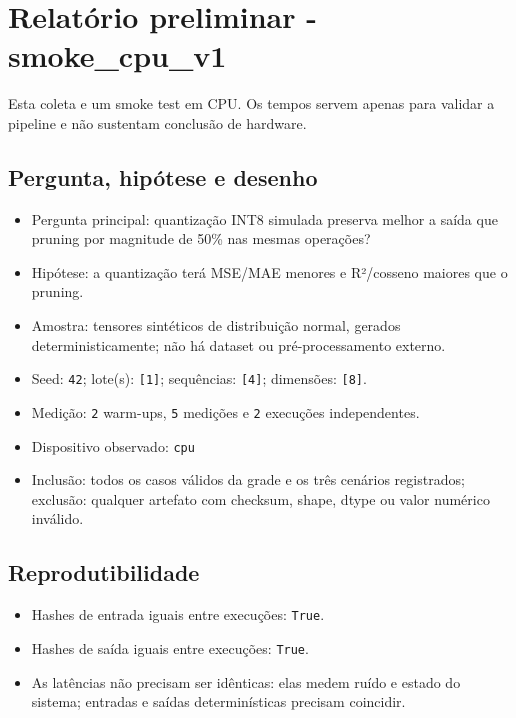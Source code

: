 

\chapter{Relatório preliminar - smoke\_\allowbreak{}cpu\_\allowbreak{}v1}



\begin{icquote}
Esta coleta e um smoke test em CPU. Os tempos servem apenas para validar a pipeline e não sustentam conclusão de hardware.
\end{icquote}



\section{Pergunta, hipótese e desenho}


\begin{itemize}
\item Pergunta principal: quantização INT8 simulada preserva melhor a saída que pruning por magnitude de 50\% nas mesmas operações?
\item Hipótese: a quantização terá MSE/MAE menores e R²/cosseno maiores que o pruning.
\item Amostra: tensores sintéticos de distribuição normal, gerados deterministicamente; não há dataset ou pré-processamento externo.
\item Seed: \texttt{42}; lote(s): \texttt{[1]}; sequências: \texttt{[4]}; dimensões: \texttt{[8]}.
\item Medição: \texttt{2} warm-ups, \texttt{5} medições e \texttt{2} execuções independentes.
\item Dispositivo observado: \texttt{cpu}
\item Inclusão: todos os casos válidos da grade e os três cenários registrados; exclusão: qualquer artefato com checksum, shape, dtype ou valor numérico inválido.
\end{itemize}


\section{Reprodutibilidade}


\begin{itemize}
\item Hashes de entrada iguais entre execuções: \texttt{True}.
\item Hashes de saída iguais entre execuções: \texttt{True}.
\item As latências não precisam ser idênticas: elas medem ruído e estado do sistema; entradas e saídas determinísticas precisam coincidir.
\end{itemize}


